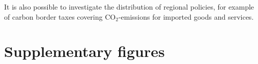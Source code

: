 \documentclass[12pt, a4paper]{article}
\begin{document}
It is also possible to investigate the distribution of regional policies, for example of carbon border taxes covering CO$_{2}$-emissions for imported goods and services. 

\clearpage

\renewcommand\thefigure{\thesection.\arabic{figure}}
\renewcommand\thetable{\thesection.\arabic{table}}
\setcounter{figure}{0}
\setcounter{table}{0}

\section{Supplementary figures} \label{sec:figures}


\clearpage


\clearpage


\clearpage


\clearpage
\end{document}
